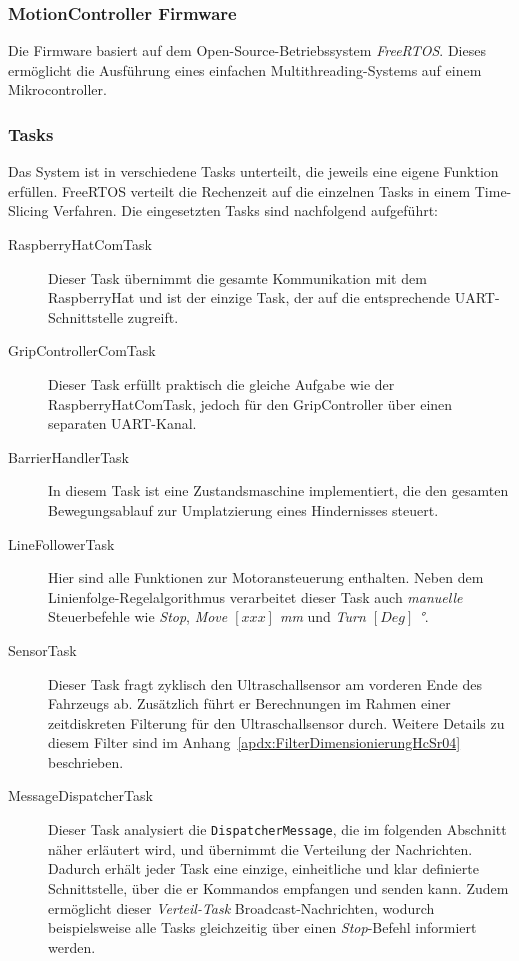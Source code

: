 \documentclass[main.tex]{subfiles} %
\begin{document}

\subsubsection{MotionController Firmware}

Die Firmware basiert auf dem Open-Source-Betriebssystem \textit{FreeRTOS}.
Dieses ermöglicht die Ausführung eines einfachen Multithreading-Systems auf
einem Mikrocontroller.

\subsubsection*{Tasks}

Das System ist in verschiedene Tasks unterteilt, die jeweils eine eigene
Funktion erfüllen. FreeRTOS verteilt die Rechenzeit auf die einzelnen Tasks in
einem Time-Slicing Verfahren. Die eingesetzten Tasks sind nachfolgend
aufgeführt:

\begin{description}

    \item[RaspberryHatComTask] Dieser Task übernimmt die gesamte Kommunikation mit dem
        RaspberryHat und ist der einzige Task, der auf die entsprechende
        UART-Schnittstelle zugreift.

    \item[GripControllerComTask] Dieser Task erfüllt praktisch die gleiche Aufgabe wie
        der RaspberryHatComTask, jedoch für den GripController über einen separaten
        UART-Kanal.

    \item[BarrierHandlerTask] In diesem Task ist eine Zustandsmaschine implementiert, die
        den gesamten Bewegungsablauf zur Umplatzierung eines Hindernisses steuert.

    \item[LineFollowerTask] Hier sind alle Funktionen zur Motoransteuerung enthalten.
        Neben dem Linienfolge-Regelalgorithmus verarbeitet dieser Task auch
        \textit{manuelle} Steuerbefehle wie \textit{Stop}, \textit{Move $[xxx]$ mm} und
        \textit{Turn $[Deg]$ °}.

    \item[SensorTask] Dieser Task fragt zyklisch den Ultraschallsensor am vorderen Ende
        des Fahrzeugs ab. Zusätzlich führt er Berechnungen im Rahmen einer
        zeitdiskreten Filterung für den Ultraschallsensor durch. Weitere Details zu
        diesem Filter sind im Anhang~\ref{apdx:FilterDimensionierungHcSr04}
        beschrieben.

    \item[MessageDispatcherTask] Dieser Task analysiert die \texttt{DispatcherMessage},
        die im folgenden Abschnitt näher erläutert wird, und übernimmt die Verteilung
        der Nachrichten. Dadurch erhält jeder Task eine einzige, einheitliche und klar
        definierte Schnittstelle, über die er Kommandos empfangen und senden kann.
        Zudem ermöglicht dieser \textit{Verteil-Task} Broadcast-Nachrichten, wodurch
        beispielsweise alle Tasks gleichzeitig über einen \textit{Stop}-Befehl
        informiert werden.
\end{description}
\end{document}
